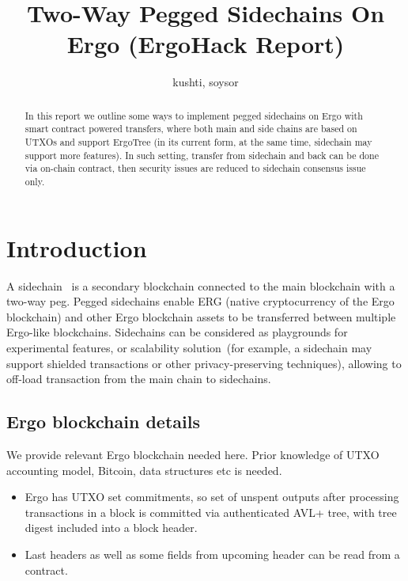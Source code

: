 \documentclass{article}   %
\begin{document}
\title{Two-Way Pegged Sidechains On Ergo (ErgoHack Report)}
\author{kushti, soysor}


\maketitle

\begin{abstract}
In this report we outline some ways to implement pegged sidechains on Ergo with smart contract powered transfers, where both main and
  side chains are based on UTXOs and support ErgoTree (in its current form, at the same time, sidechain may support more features).
In such setting, transfer from sidechain and back can be done via on-chain contract, then security issues are reduced to
  sidechain consensus issue only.
\end{abstract}


\section{Introduction}

A sidechain~\cite{back2014enabling} is a secondary blockchain connected to the main blockchain with a two-way peg.
Pegged sidechains enable ERG (native cryptocurrency of the Ergo blockchain) and other Ergo blockchain assets to be
transferred between multiple Ergo-like blockchains. Sidechains can be considered as playgrounds for experimental features,
or scalability solution~(for example, a sidechain may support shielded transactions or other privacy-preserving
techniques), allowing to off-load transaction from the main chain to sidechains.

\subsection{Ergo blockchain details}

We provide relevant Ergo blockchain needed here. Prior knowledge of UTXO accounting model, Bitcoin, data structures etc
is needed.
\begin{itemize}
\item{} Ergo has UTXO set commitments, so set of unspent outputs after processing transactions in a block is committed via
authenticated AVL+ tree, with tree digest included into a block header.
\item{} Last headers as well as some fields from upcoming header can be read from a contract.
\end{itemize}
\end{document}

